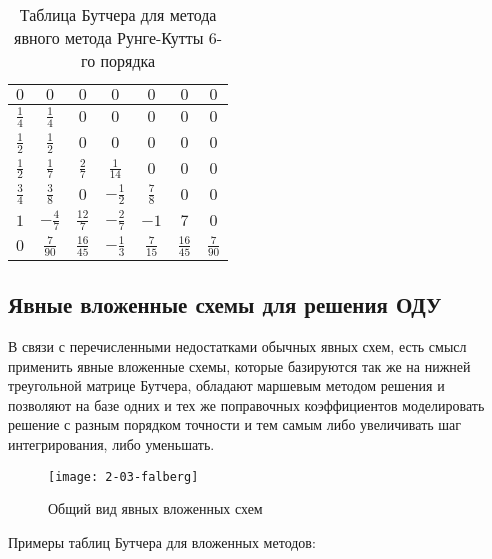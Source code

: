 \begin{table}    
    \caption{Таблица Бутчера для метода явного метода Рунге-Кутты 6-го порядка}
    \begin{tabular}{|c|c|c|c|c|c|c|}
    \hline
    $0$ & $0$ & $0$ & $0$ & $0$ & $0$ & $0$\\
    \hline
    $\frac{1}{4}$ & $\frac{1}{4}$ & $0$ & $0$ & $0$ & $0$ & $0$\\
    \hline
    $\frac{1}{2}$ & $\frac{1}{2}$ & $0$ & $0$ & $0$ & $0$ & $0$\\
    \hline
    $\frac{1}{2}$ & $\frac{1}{7}$ & $\frac{2}{7}$ & $\frac{1}{14}$ & $0$ & $0$ & $0$\\
    \hline
    $\frac{3}{4}$ & $\frac{3}{8}$ & $0$ & $-\frac{1}{2}$ & $\frac{7}{8}$ & $0$ & $0$\\
    \hline
    $1$ & $-\frac{4}{7}$ & $\frac{12}{7}$ & $-\frac{2}{7}$ & $-1$ & $7$ & $0$\\
    \hline
    $0$ & \cellcolor{lightgray} $\frac{7}{90}$ & \cellcolor{lightgray} $\frac{16}{45}$ & \cellcolor{lightgray} $-\frac{1}{3}$ & \cellcolor{lightgray} $\frac{7}{15}$ & \cellcolor{lightgray} $\frac{16}{45}$ & \cellcolor{lightgray} $\frac{7}{90}$\\
    \hline
    \end{tabular}
    \label{tab:RungeKutta6}
\end{table}

\subsection{Явные вложенные схемы для решения ОДУ}

В связи с перечисленными недостатками обычных явных схем, есть смысл применить явные вложенные схемы, которые базируются так же на
нижней треугольной матрице Бутчера, обладают маршевым
методом решения и позволяют на базе одних и тех же поправочных коэффициентов моделировать решение с разным порядком точности и тем
самым либо увеличивать шаг интегрирования, либо уменьшать.


\begin{figure}
    \texttt{[image: 2-03-falberg]}
    \caption{Общий вид явных вложенных схем}
    \label{fig:Falberg}
\end{figure}

Примеры таблиц Бутчера для вложенных методов:

